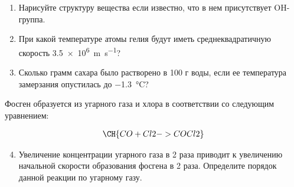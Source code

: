 

\begin{enumerate}
    \item Нарисуйте структуру вещества  если известно, что в нем присутствует OH-группа.
    \item При какой температуре атомы гелия будут иметь среднеквадратичную скорость \qty{3.5e6}{\meter\per\second}?
    \item Сколько грамм сахара было растворено в 100 г воды, если ее температура замерзания опустилась до \qty{-1.3}{\celsius}?
\end{enumerate}

Фосген образуется из угарного газа и хлора в соответствии со следующим уравнением:

\begin{gather*}
    \CH{CO + Cl2 -> COCl2}
\end{gather*}

\begin{enumerate}
\setcounter{enumi}{3}
    \item Увеличение концентрации угарного газа в 2 раза приводит к увеличению начальной скорости образования фосгена в 2 раза. Определите порядок данной реакции по угарному газу.
\end{enumerate}
